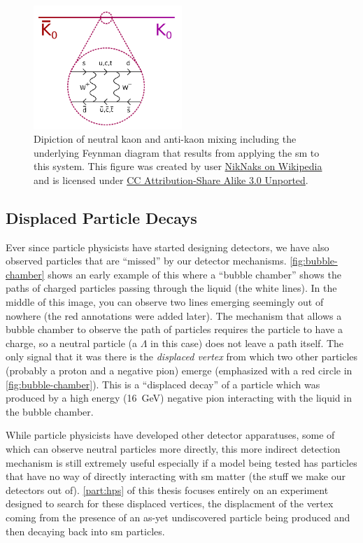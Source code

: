 \begin{figure}
	\centering
	\includegraphics[width=0.5\textwidth]{figures/intro/Kaon-box-diagram-with-bar.pdf}
	\caption{
		Dipiction of neutral kaon and anti-kaon mixing including the underlying
		Feynman diagram that results from applying the \ac{sm} to this system.
		This figure was created by user
		\href{https://commons.wikimedia.org/wiki/File:Kaon-box-diagram-with-bar.svg}{NikNaks on Wikipedia}
		and is licensed under
		\href{https://creativecommons.org/licenses/by-sa/3.0/deed.en}{CC Attribution-Share Alike 3.0 Unported}.
	}
	\label{fig:kaon-box-diagram}
\end{figure}

\subsection{Displaced Particle Decays}
Ever since particle physicists have started designing detectors, we have also observed
particles that are ``missed'' by our detector mechanisms. \cref{fig:bubble-chamber}
shows an early example of this where a ``bubble chamber'' shows the paths of
charged particles passing through the liquid (the white lines). In the middle of this
image, you can observe two lines emerging seemingly out of nowhere (the red annotations were
added later).
The mechanism that allows a bubble chamber to observe the path of particles requires the particle
to have a charge, so a neutral particle (a \(\Lambda\) in this case) does not leave a path itself.
The only signal that it was there is the \emph{displaced vertex} from which two other particles
(probably a proton and a negative pion) emerge
(emphasized with a red circle in \cref{fig:bubble-chamber}).
This is a ``displaced decay'' of a particle which was produced by a high energy
(\qty{16}{\giga\electronvolt}) negative pion interacting with the liquid in the bubble chamber.

While particle physicists have developed other detector apparatuses, some of which can observe
neutral particles more directly, this more indirect detection mechanism is still extremely
useful especially if a model being tested has particles that have no way of directly interacting
with \ac{sm} matter (the stuff we make our detectors out of). \cref{part:hps} of this thesis
focuses entirely on an experiment designed to search for these displaced vertices, the displacment
of the vertex coming from the presence of an as-yet undiscovered particle being produced and then
decaying back into \ac{sm} particles.

